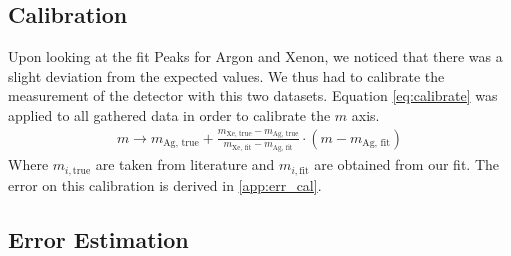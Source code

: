 \subsection{Calibration}
Upon looking at the fit Peaks for Argon and Xenon, we noticed that there was a slight deviation from the expected values. We thus had to calibrate the measurement of the detector with this two datasets. Equation \eqref{eq:calibrate} was applied to all gathered data in order to calibrate the $m$ axis.
\begin{align}
    m \to m_\text{Ag, true} + \frac{m_\text{Xe, true} - m_\text{Ag, true}}{m_\text{Xe, fit} - m_\text{Ag, fit}} \cdot (m - m_\text{Ag, fit}) \label{eq:calibrate}
\end{align}
Where $m_{i, \text{true}}$ are taken from literature and $m_{i, \text{fit}}$ are obtained from our fit.
The error on this calibration is derived in \ref{app:err_cal}.
\subsection{Error Estimation}


